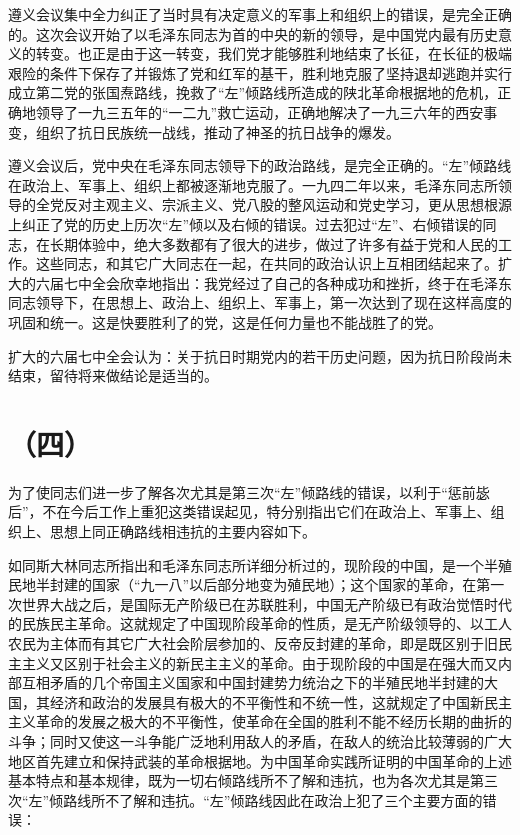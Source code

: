 遵义会议集中全力纠正了当时具有决定意义的军事上和组织上的错误，是完全正确的。这次会议开始了以毛泽东同志为首的中央的新的领导，是中国党内最有历史意义的转变。也正是由于这一转变，我们党才能够胜利地结束了长征，在长征的极端艰险的条件下保存了并锻炼了党和红军的基干，胜利地克服了坚持退却逃跑并实行成立第二党的张国焘路线，挽救了“左”倾路线所造成的陕北革命根据地的危机，正确地领导了一九三五年的“一二九”救亡运动，正确地解决了一九三六年的西安事变，组织了抗日民族统一战线，推动了神圣的抗日战争的爆发。

遵义会议后，党中央在毛泽东同志领导下的政治路线，是完全正确的。“左”倾路线在政治上、军事上、组织上都被逐渐地克服了。一九四二年以来，毛泽东同志所领导的全党反对主观主义、宗派主义、党八股的整风运动和党史学习，更从思想根源上纠正了党的历史上历次“左”倾以及右倾的错误。过去犯过“左”、右倾错误的同志，在长期体验中，绝大多数都有了很大的进步，做过了许多有益于党和人民的工作。这些同志，和其它广大同志在一起，在共同的政治认识上互相团结起来了。扩大的六届七中全会欣幸地指出：我党经过了自己的各种成功和挫折，终于在毛泽东同志领导下，在思想上、政治上、组织上、军事上，第一次达到了现在这样高度的巩固和统一。这是快要胜利了的党，这是任何力量也不能战胜了的党。

扩大的六届七中全会认为：关于抗日时期党内的若干历史问题，因为抗日阶段尚未结束，留待将来做结论是适当的。

\section*{（四）}

为了使同志们进一步了解各次尤其是第三次“左”倾路线的错误，以利于“惩前毖后”，不在今后工作上重犯这类错误起见，特分别指出它们在政治上、军事上、组织上、思想上同正确路线相违抗的主要内容如下。


如同斯大林同志所指出和毛泽东同志所详细分析过的，现阶段的中国，是一个半殖民地半封建的国家（“九一八”以后部分地变为殖民地）；这个国家的革命，在第一次世界大战之后，是国际无产阶级已在苏联胜利，中国无产阶级已有政治觉悟时代的民族民主革命。这就规定了中国现阶段革命的性质，是无产阶级领导的、以工人农民为主体而有其它广大社会阶层参加的、反帝反封建的革命，即是既区别于旧民主主义又区别于社会主义的新民主主义的革命。由于现阶段的中国是在强大而又内部互相矛盾的几个帝国主义国家和中国封建势力统治之下的半殖民地半封建的大国，其经济和政治的发展具有极大的不平衡性和不统一性，这就规定了中国新民主主义革命的发展之极大的不平衡性，使革命在全国的胜利不能不经历长期的曲折的斗争；同时又使这一斗争能广泛地利用敌人的矛盾，在敌人的统治比较薄弱的广大地区首先建立和保持武装的革命根据地。为中国革命实践所证明的中国革命的上述基本特点和基本规律，既为一切右倾路线所不了解和违抗，也为各次尤其是第三次“左”倾路线所不了解和违抗。“左”倾路线因此在政治上犯了三个主要方面的错误：

